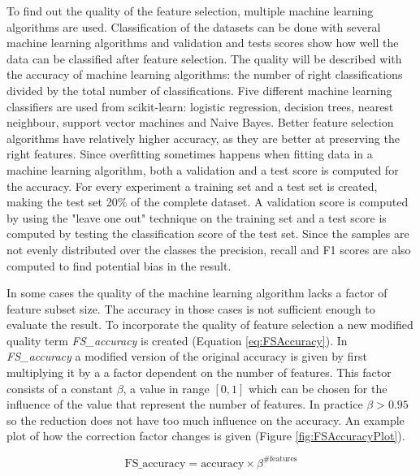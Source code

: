 \documentclass[10pt,a4paper]{report}
\begin{document}
	To find out the quality of the feature selection, multiple machine learning algorithms are used\cite{hall1998practical}.  Classification of the datasets can be done with several machine learning algorithms and validation and tests scores show how well the data can be classified after feature selection. The quality will be described with the accuracy of machine learning algorithms: the number of right classifications divided by the total number of classifications. Five different machine learning classifiers are used from scikit-learn: logistic regression, decision trees, nearest neighbour, support vector machines and Naive Bayes. Better feature selection algorithms have relatively higher accuracy, as they are better at preserving the right features. Since overfitting sometimes happens when fitting data in a machine learning algorithm, both a validation and a test score is computed for the accuracy. For every experiment a training set and a test set is created, making the test set 20\% of the complete dataset. A validation score is computed by using the "leave one out" technique on the training set and a test score is computed by testing the classification score of the test set. Since the samples are not evenly distributed over the classes the precision, recall and F1 scores are also computed to find potential bias in the result.
	
	In some cases the quality of the machine learning algorithm lacks a factor of feature subset size. The accuracy in those cases is not sufficient enough to evaluate the result. To incorporate the quality of feature selection a new modified quality term \textit{FS\_accuracy} is created (Equation \ref{eq:FSAccuracy}). In \textit{FS\_accuracy} a modified version of the original accuracy is given by first multiplying it by a a factor dependent on the number of features. This factor consists of a constant $\beta$, a value in range $[0, 1]$ which can be chosen for the influence of the  value that represent the number of features. In practice $\beta > 0.95$ so the reduction does not have too much influence on the accuracy. An example plot of how the correction factor changes is given (Figure \ref{fig:FSAccuracyPlot}).
	
	\begin{equation*}
	\label{eq:FSAccuracy}
	\text{FS\_accuracy} = \text{accuracy} \times \beta^{\text{\#features}}
	\end{equation*}
	
\end{document}

